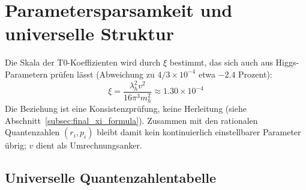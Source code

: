 \section{Parametersparsamkeit und universelle Struktur}
\label{sec:parameter_free_nature}

\begin{important}
	Die Skala der T0-Koeffizienten wird durch $\xi$ bestimmt, das sich auch aus Higgs-Parametern prüfen lässt (Abweichung zu $4/3 \times 10^{-4}$ etwa $-2.4$ Prozent):
	\begin{equation}
		\xi = \frac{\lambda_h^2 v^2}{16\pi^3 m_h^2} \approx 1.30 \times 10^{-4}
	\end{equation}
			Die Beziehung ist eine Konsistenzprüfung, keine Herleitung (siehe Abschnitt~\ref{subsec:final_xi_formula}).
	Zusammen mit den rationalen Quantenzahlen $(r_i, p_i)$ bleibt damit kein kontinuierlich einstellbarer Parameter übrig; $v$ dient als Umrechnungsanker.
\end{important}

\subsection{Universelle Quantenzahlentabelle}
\label{subsec:universal_quantum_table}

\begin{table}[H]
	\centering
	\caption{Universelle Quantenzahlentabelle für alle Fermionen}
	\label{tab:universal_quantum_numbers}
\end{table}

